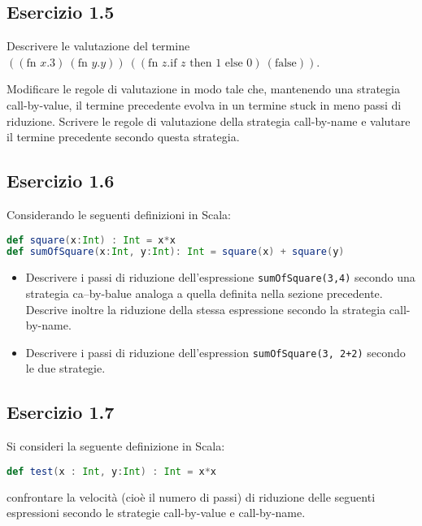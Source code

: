 \subsection{Esercizio 1.5}

Descrivere le valutazione del termine $((\text{fn }x.3) \: (\text{fn }y.y)) \: ((\text{fn }z.\text{if } z \text{ then } 1 \text{ else } 0) \: (\text{false}))$.

Modificare le regole di valutazione in modo tale che, mantenendo una strategia call-by-value, il termine precedente evolva in un termine stuck in meno passi di riduzione. Scrivere le regole di valutazione della strategia call-by-name e valutare il termine precedente secondo questa strategia.


\subsection{Esercizio 1.6}

Considerando le seguenti definizioni in Scala:

\begin{lstlisting}[language=scala]
def square(x:Int) : Int = x*x
def sumOfSquare(x:Int, y:Int): Int = square(x) + square(y)
\end{lstlisting}

\begin{itemize}
	\item Descrivere i passi di riduzione dell'espressione \texttt{sumOfSquare(3,4)} secondo una strategia ca--by-balue analoga a quella definita nella sezione precedente. Descrive inoltre la riduzione della stessa espressione secondo la strategia call-by-name.
	\item Descrivere i passi di riduzione dell'espression \texttt{sumOfSquare(3, 2+2)} secondo le due strategie.  
\end{itemize}

\subsection{Esercizio 1.7}

Si consideri la seguente definizione in Scala:

\begin{lstlisting}[language=Scala]
def test(x : Int, y:Int) : Int = x*x
\end{lstlisting}

confrontare la velocità (cioè il numero di passi) di riduzione delle seguenti espressioni secondo le strategie call-by-value e call-by-name.

